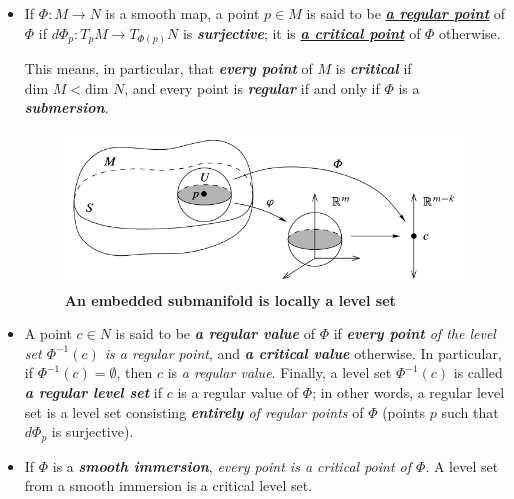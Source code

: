 \documentclass[11pt]{article}
\begin{document}
\begin{itemize}
\item \begin{definition}
If $\Phi: M \rightarrow N$ is a smooth map, a point $p \in M$ is said to be \underline{\emph{\textbf{a regular point}}} of $\Phi$ if $d\Phi_{p}: T_{p}M \rightarrow
T_{\Phi(p)}N$ is \emph{\textbf{surjective}}; it is \underline{\emph{\textbf{a critical point}}} of $\Phi$ otherwise. 

This means, in particular, that \emph{\textbf{every point}} of $M$ is \emph{\textbf{critical}} if \underline{$\text{dim }M < \text{dim }N$}, and every point is \emph{\textbf{regular}} if and only if $\Phi$ is a \emph{\textbf{submersion}}. 
\end{definition}


\begin{figure}
\begin{minipage}[htb]{1\linewidth}
  \centering
  \centerline{\includegraphics[scale = 0.45]{embedded_subman_local_level_set.png}}
\end{minipage}
\caption{\footnotesize{\textbf{An embedded submanifold is locally a level set \citep{lee2003introduction}}}}
\label{fig: embedded_subman_local_level_set}
\end{figure}

\item \begin{definition}
A point $c \in N$ is said to be \emph{\textbf{a regular value}} of  $\Phi$ if \emph{\textbf{every point} of the level set $\Phi^{-1}(c)$  is a regular point}, and \emph{\textbf{a critical value}} otherwise. In particular, if $\Phi^{-1}(c) = \emptyset$, then $c$ is \emph{a regular value}. Finally, a level set $\Phi^{-1}(c)$  is called \emph{\textbf{a regular level set}} if $c$ is a regular value of $\Phi$; in other words, a regular level set is a level set consisting \emph{\textbf{entirely} of regular points} of $\Phi$ (points $p$ such that $d\Phi_{p}$ is surjective).
\end{definition}

\item \begin{remark}
If $\Phi$ is a \emph{\textbf{smooth immersion}}, \emph{every point is a critical point of $\Phi$}. A level set from a smooth immersion is a critical level set. 
\end{remark}


\end{itemize}
\end{document}
